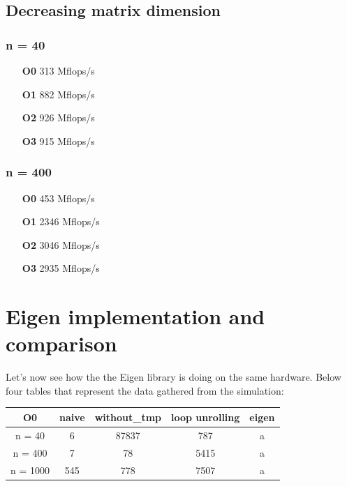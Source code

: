 \documentclass[11pt,a4paper,oneside,titlepage,openright]{book}
\begin{document}
\section{Decreasing matrix dimension} 

\subsection{n = 40}
\begin{itemize}
\item[\textbf{O0}] 313 Mflops/s
\item[\textbf{O1}] 882 Mflops/s
\item[\textbf{O2}] 926 Mflops/s
\item[\textbf{O3}] 915 Mflops/s
\end{itemize}

\subsection{ n = 400}

\begin{itemize}
\item[\textbf{O0}] 453  Mflops/s
\item[\textbf{O1}] 2346 Mflops/s
\item[\textbf{O2}] 3046 Mflops/s
\item[\textbf{O3}] 2935 Mflops/s
\end{itemize}


\chapter{Eigen implementation and comparison}

Let's now see how the the Eigen library is doing on the same hardware. 
Below four tables that represent the data gathered from the simulation:

\begin{center}
 \begin{tabular}{|c c c c c |} 
 \hline
 O0 & naive & without\_tmp & loop unrolling & eigen \\ [0.5ex] 
 \hline
 n = 40 & 6 & 87837 & 787  & a\\ 
 \hline
 n = 400 & 7 & 78 & 5415 & a\\
 \hline
 n = 1000 & 545 & 778 & 7507 & a\\
 \hline
\end{tabular}
\end{center}
\end{document}
